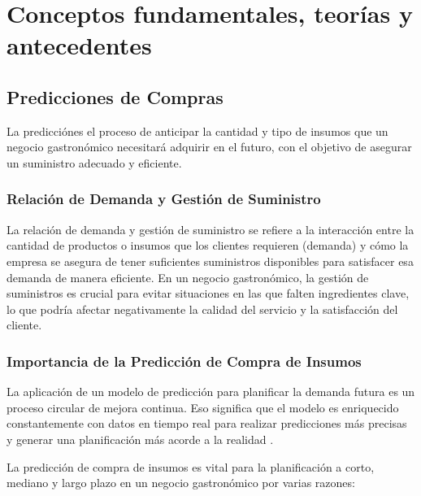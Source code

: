 \fancyhead{}
\fancyfoot{}
\newtheorem{teorema}{Teorema}
\cfoot{\thepage}


\chapter{Conceptos fundamentales, teorías y antecedentes}

\section{Predicciones de Compras}
La predicciónes el proceso de anticipar la cantidad y tipo de insumos que un negocio gastronómico necesitará adquirir en el futuro, con el objetivo de asegurar un suministro adecuado y eficiente.


\subsection{Relación de Demanda y Gestión de Suministro}

La relación de demanda y gestión de suministro se refiere a la interacción entre la cantidad de productos o insumos que los clientes requieren (demanda) y cómo la empresa se asegura de tener suficientes suministros disponibles para satisfacer esa demanda de manera eficiente. En un negocio gastronómico, la gestión de suministros es crucial para evitar situaciones en las que falten ingredientes clave, lo que podría afectar negativamente la calidad del servicio y la satisfacción del cliente.


\subsection{Importancia de la Predicción de Compra de Insumos}

La aplicación de un modelo de predicción para planificar la demanda futura es un proceso circular de mejora continua. Eso significa que el modelo es enriquecido constantemente con datos en tiempo real para realizar predicciones más precisas y generar una planificación más acorde a la realidad \cite{decide}.

\vspace{1\baselineskip}
La predicción de compra de insumos es vital para la planificación a corto, mediano y largo plazo en un negocio gastronómico por varias razones:

